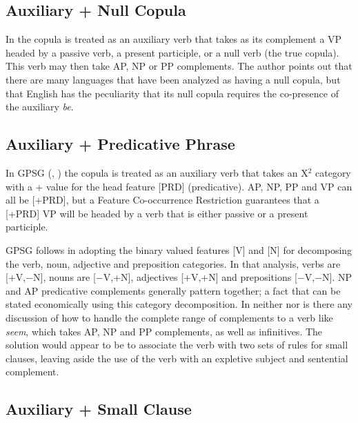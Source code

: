 \subsection{Auxiliary + Null Copula}
\label{la}

In \cite{lapointe80} the copula is treated as an auxiliary verb that takes as its
complement a VP headed by a passive verb, a present participle, or a null verb
(the true copula). This verb may then take AP, NP or PP complements.  The
author points out that there are many languages that have been analyzed as
having a null copula, but that English has the peculiarity that its
null copula requires the co-presence of the auxiliary {\it be}.

\subsection{Auxiliary + Predicative Phrase}
\label{gpsg}

In GPSG (\cite{gazdar85}, \cite{sag85}) the copula is treated as an auxiliary
verb that takes an X$^{2}$ category with a + value for the head feature
[PRD] (predicative). AP, NP, PP and VP can all be [+PRD], but a
Feature Co-occurrence Restriction guarantees that a [+PRD] VP will be
headed by a verb that is either passive or a present participle.

GPSG follows \cite{chomsky70} in adopting the binary valued features [V] and
[N] for decomposing the verb, noun, adjective and preposition categories.  In
that analysis, verbs are [+V,$-$N], nouns are [$-$V,+N], adjectives [+V,+N] and
prepositions [$-$V,$-$N].  NP and AP predicative complements generally pattern
together; a fact that can be stated economically using this category
decomposition.  In neither \cite{sag85} nor \cite{chomsky70} is there any
discussion of how to handle the complete range of complements to a verb like
{\it seem}, which takes AP, NP and PP complements, as well as infinitives.  The
solution would appear to be to associate the verb with two sets of rules for
small clauses, leaving aside the use of the verb with an expletive subject and
sentential complement.

\subsection{Auxiliary + Small Clause}

